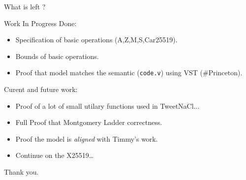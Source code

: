 \documentclass[8pt]{beamer}
\begin{document}
\begin{frame}[standout]
  \Huge What is left ?
\end{frame}

\begin{frame}[fragile]{Work In Progress}
    Done:
    \begin{itemize}
      \item Specification of basic operations (A,Z,M,S,Car25519).
      \item Bounds of basic operations.
      \item Proof that model matches the semantic (\texttt{code.v}) using VST (\#Princeton).
    \end{itemize}

    Curent and future work:
    \begin{itemize}
      \item Proof of a lot of small utilary functions used in TweetNaCl...
      \item Full Proof that Montgomery Ladder correctness.
      \item Proof the model is {\it aligned} with Timmy's work.
      \item Continue on the X25519\ldots
    \end{itemize}
\end{frame}





%
%
\begin{frame}[standout]
	\Huge Thank you.
\end{frame}
\end{document}
